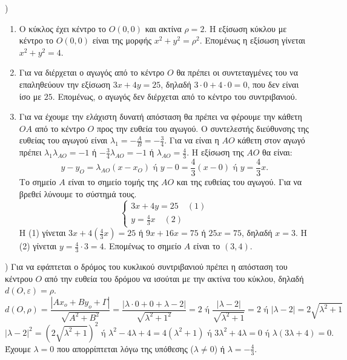 {\large \Alpha)}
\begin{enumerate}
    \item Ο κύκλος έχει κέντρο το $O(0,0)$ και ακτίνα $\rho=2$. Η εξίσωση κύκλου με κέντρο το $O(0,0)$ είναι της μορφής $x^2 + y^2 = \rho^2$. Επομένως η εξίσωση γίνεται $x^2 + y^2 = 4$.
    \item Για να διέρχεται ο αγωγός από το κέντρο $O$ θα πρέπει οι συντεταγμένες του να επαληθεύουν την εξίσωση $3x+4y=25$, δηλαδή $3 \cdot 0 + 4 \cdot 0 = 0$, που δεν είναι ίσο με $25$. Επομένως, ο αγωγός δεν διέρχεται από το κέντρο του συντριβανιού.
    \item Για να έχουμε την ελάχιστη δυνατή απόσταση θα πρέπει να φέρουμε την κάθετη $OA$ από το κέντρο $O$ προς την ευθεία του αγωγού. Ο συντελεστής διεύθυνσης της ευθείας του αγωγού είναι $\lambda_1 = -\frac{A}{B} = -\frac{3}{4}$. Για να είναι η $AO$ κάθετη στον αγωγό πρέπει $\lambda_{1} \lambda_{AO} = -1$ ή $-\frac{3}{4} \lambda_{AO} = -1$ ή $\lambda_{AO} = \frac{4}{3}$. Η εξίσωση της $AO$ θα είναι:
    \[ y-y_O = \lambda_{AO}(x-x_O) \text{ ή } y-0 = \frac{4}{3}(x-0) \text{ ή } y = \frac{4}{3}x. \]
    Το σημείο $A$ είναι το σημείο τομής της $AO$ και της ευθείας του αγωγού. Για να βρεθεί λύνουμε το σύστημά τους.
    \[ \begin{cases} 3x+4y=25 \quad (1) \\ y=\frac{4}{3}x \quad (2) \end{cases} \]
    Η (1) γίνεται $3x+4\left(\frac{4}{3}x\right) = 25$ ή $9x+16x=75$ ή $25x=75$, δηλαδή $x=3$. Η (2) γίνεται $y=\frac{4}{3} \cdot 3 = 4$. Επομένως το σημείο $A$ είναι το $(3,4)$.
\end{enumerate}

\newpage
{\large \Beta)}
Για να εφάπτεται ο δρόμος του κυκλικού συντριβανιού πρέπει η απόσταση του κέντρου $O$ από την ευθεία του δρόμου να ισούται με την ακτίνα του κύκλου, δηλαδή $d(O,\varepsilon)=\rho$.
\[ d(O,\rho) = \frac{|Ax_o + By_o + \Gamma|}{\sqrt{A^2+B^2}} = \frac{|\lambda \cdot 0 + 0 + \lambda-2|}{\sqrt{\lambda^2+1^2}} = 2 \text{ ή } \frac{|\lambda-2|}{\sqrt{\lambda^2+1}} = 2 \text{ ή } |\lambda-2| = 2\sqrt{\lambda^2+1} \]
\[ |\lambda-2|^2 = (2\sqrt{\lambda^2+1})^2 \text{ ή } \lambda^2-4\lambda+4 = 4(\lambda^2+1) \text{ ή } 3\lambda^2+4\lambda = 0 \text{ ή } \lambda(3\lambda+4) = 0. \]
Έχουμε $\lambda = 0$ που απορρίπτεται λόγω της υπόθεσης ($\lambda \ne 0$) ή $\lambda = -\frac{4}{3}$.